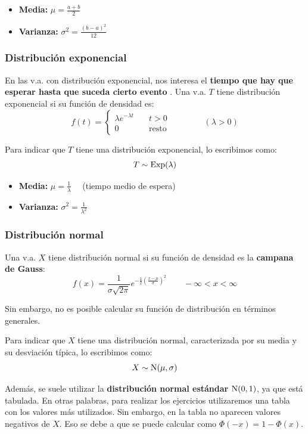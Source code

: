 \documentclass[a4paper]{book}
\begin{document}
\begin{itemize}
	\item \textbf{Media:} $\displaystyle{\mu = \frac{a+b}{2}}$
	\item \textbf{Varianza:} $\displaystyle{\sigma ^2 = \frac{\left( b-a \right)^2}{12}}$
\end{itemize}

\subsubsection{Distribución exponencial}
En las v.a. con distribución exponencial, nos interesa el \textbf{tiempo que hay que esperar hasta que suceda cierto evento }. Una v.a. $T$ tiene distribución exponencial si su función de densidad es: \[f(t) = \left\{ \begin{matrix}
		\lambda e^{-\lambda t} & \quad t>0           \\[5pt]
		0                      & \quad  \text{resto}
	\end{matrix} \right.\qquad\qquad  \left( \lambda >0 \right)\]

Para indicar que $T$ tiene una distribución exponencial, lo escribimos como: \[T\sim \operatorname{Exp}(\lambda )\]

\begin{itemize}
	\item \textbf{Media:} $\displaystyle{\mu = \frac{1}{\lambda}}\quad $ (tiempo medio de espera)
	\item \textbf{Varianza:} $\displaystyle{\sigma ^2 = \frac{1}{\lambda ^2}}$
\end{itemize}

\subsubsection{Distribución normal}
Una v.a. $X$ tiene distribución normal si su función de densidad es la \textbf{campana de Gauss}: \[f(x) = \frac{1}{\sigma \sqrt{2\pi}}e^{-\frac{1}{2}\left( \frac{x-\mu }{\sigma} \right)^2} \qquad -\infty <x< \infty \]

Sin embargo, no es posible calcular su función de distribución en términos generales.

Para indicar que $X$ tiene una distribución normal, caracterizada por su media y su desviación típica, lo escribimos como: \[X \sim \operatorname{N}(\mu , \sigma ) \]

Además, se suele utilizar la \textbf{distribución normal estándar} $\operatorname{N}(0,1)$, ya que está tabulada. En otras palabras, para realizar los ejercicios utilizaremos una tabla con los valores más utilizados. Sin embargo, en la tabla no aparecen valores negativos de $X$. Eso se debe a que se puede calcular como $\Phi (-x) = 1 - \Phi(x)$.
\end{document}

